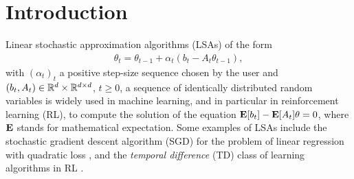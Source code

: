 \section{Introduction}
Linear stochastic approximation algorithms (LSAs) 
of the form
\begin{align}\label{eq:lsaintro}
\theta_t=\theta_{t-1}+\alpha_t (b_t-A_t \theta_{t-1}),
\end{align}
with $(\alpha_t)_t$ a positive step-size sequence chosen by the user and 
$(b_t,A_t)\in \mathbb{R}^d\times \mathbb{R}^{d \times d}$,  $t\geq 0$, a sequence of identically distributed random variables is widely used in
machine learning, and in particular in reinforcement learning (RL), to compute the solution of the equation 
$\mathbf{E}[b_t] - \mathbf{E}[A_t] \theta = 0$, where $\mathbf{E}$ stands for mathematical expectation.
Some examples of LSAs include the stochastic gradient descent algorithm (SGD) for the problem of linear regression with quadratic loss \cite{bach,bachaistats}, and the \emph{temporal difference} (TD) class of learning algorithms in RL \cite{sutton,konda-tsitsiklis,KoTsi03:LSA,gtd,gtd2,gtdmp}.

